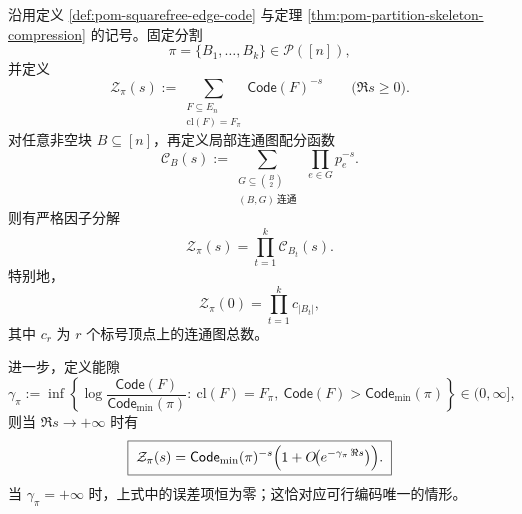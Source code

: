 \begin{theorem}\label{thm:conclusion-partition-squarefree-partition-function-groundstate}
沿用定义 \ref{def:pom-squarefree-edge-code} 与定理 \ref{thm:pom-partition-skeleton-compression} 的记号。固定分割
\[
\pi=\{B_1,\dots,B_k\}\in\mathcal P([n]),
\]
并定义
\[
\mathcal Z_\pi(s)
:=
\sum_{\substack{F\subseteq E_n\\ \mathrm{cl}(F)=F_\pi}}
\mathsf{Code}(F)^{-s}
\qquad
\bigl(\Re s\ge 0\bigr).
\]
对任意非空块 \(B\subseteq[n]\)，再定义局部连通图配分函数
\[
\mathcal C_B(s)
:=
\sum_{\substack{G\subseteq \binom{B}{2}\\ (B,G)\ \mathrm{连通}}}
\ \prod_{e\in G}p_e^{-s}.
\]
则有严格因子分解
\[
\boxed{\;
\mathcal Z_\pi(s)=\prod_{t=1}^{k}\mathcal C_{B_t}(s).\;}
\]
特别地，
\[
\boxed{\;
\mathcal Z_\pi(0)=\prod_{t=1}^{k}c_{|B_t|},\;}
\]
其中 \(c_r\) 为 \(r\) 个标号顶点上的连通图总数。

进一步，定义能隙
\[
\gamma_\pi
:=
\inf\left\{
\log\frac{\mathsf{Code}(F)}{\mathsf{Code}_{\min}(\pi)}:
\ \mathrm{cl}(F)=F_\pi,\ 
\mathsf{Code}(F)>\mathsf{Code}_{\min}(\pi)
\right\}\in(0,\infty],
\]
则当 \(\Re s\to+\infty\) 时有
\[
\boxed{\;
\mathcal Z_\pi(s)
=
\mathsf{Code}_{\min}(\pi)^{-s}
\Bigl(1+O\!\bigl(e^{-\gamma_\pi\,\Re s}\bigr)\Bigr).\;}
\]
当 \(\gamma_\pi=+\infty\) 时，上式中的误差项恒为零；这恰对应可行编码唯一的情形。
\end{theorem}
